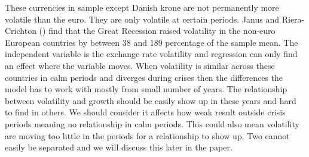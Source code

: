 These currencies in sample except Danish krone are not permanently more volatile than the euro.
They are only volatile at certain periods.
Janus and Riera-Crichton (\citeyear{thorsten_pdf_2015}) find that the Great Recession raised volatility in the non-euro European countries by between 38 and 189 percentage of the sample mean.
The independent variable is the exchange rate volatility and regression can only find an effect where the variable moves.
When volatility is similar across these countries in calm periods and diverges during crises then the differences the model has to work with mostly from small number of years.
The relationship between volatility and growth should be easily show up in these years and hard to find in others.
We should consider it affects how weak result outside crisis periods meaning no relationship in calm periods.
This could also mean volatility are moving too little in the periods for a relationship to show up.
Two cannot easily be separated and we will discuss this later in the paper.
